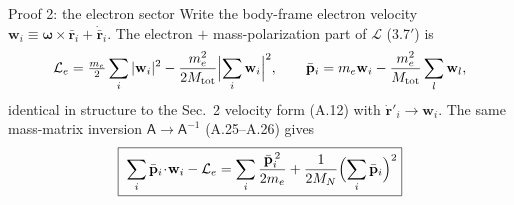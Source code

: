 \documentclass[aspectratio=169,10pt]{beamer}
\newcommand{\stagenum}{0}
\newcommand{\setstage}[1]{\renewcommand{\stagenum}{#1}}
\begin{document}
\begin{frame}{Proof 2: the electron sector}
\setstage{2}
Write the body-frame electron velocity $\mathbf w_i\equiv\boldsymbol\omega\!\times\!\bar{\mathbf r}_i+\dot{\bar{\mathbf r}}_i$. The electron $+$ mass-polarization part of $\mathcal L$ (3.7$'$) is
\begin{equation*}
\mathcal L_e=\tfrac{m_e}{2}\sum_i|\mathbf w_i|^2-\frac{m_e^2}{2M_{\mathrm{tot}}}\Bigl|\sum_i\mathbf w_i\Bigr|^2,
\qquad
\bar{\mathbf p}_i=m_e\mathbf w_i-\frac{m_e^2}{M_{\mathrm{tot}}}\sum_l\mathbf w_l,
\end{equation*}
\alert{identical in structure to the Sec.~2 velocity form (A.12) with $\dot{\mathbf r}'_i\to\mathbf w_i$.} The same mass-matrix inversion $\mathsf A\to\mathsf A^{-1}$ (A.25--A.26) gives
\begin{equation*}
\boxed{\;\sum_i\bar{\mathbf p}_i\!\cdot\!\mathbf w_i-\mathcal L_e
=\sum_i\frac{\bar{\mathbf p}_i^{\,2}}{2m_e}+\frac{1}{2M_N}\Bigl(\sum_i\bar{\mathbf p}_i\Bigr)^{2}}
\end{equation*}
\end{frame}
\end{document}

